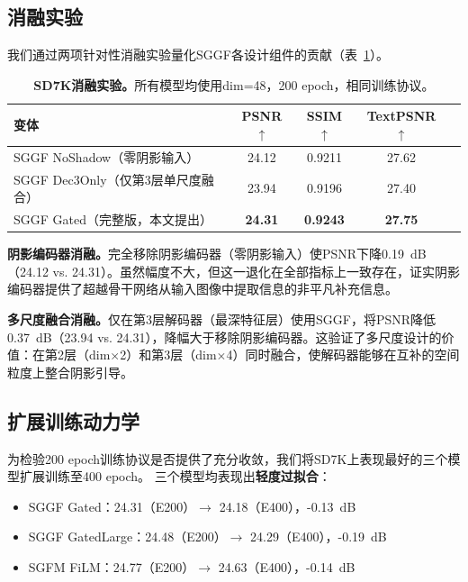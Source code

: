\documentclass[11pt]{ctexart}
\begin{document}
\subsection{消融实验}
\label{sec:ablation}

我们通过两项针对性消融实验量化SGGF各设计组件的贡献（表~\ref{tab:ablation}）。

\begin{table}[t]
\centering
\caption{\textbf{SD7K消融实验。}所有模型均使用dim=48，200 epoch，相同训练协议。}
\label{tab:ablation}
\begin{tabular}{@{}lcccc@{}}
\toprule
\textbf{变体} & \textbf{PSNR$\uparrow$} & \textbf{SSIM$\uparrow$} & \textbf{TextPSNR$\uparrow$} \\
\midrule
SGGF NoShadow（零阴影输入） & 24.12 & 0.9211 & 27.62 \\
SGGF Dec3Only（仅第3层单尺度融合） & 23.94 & 0.9196 & 27.40 \\
\rowcolor{gray!15}
SGGF Gated（完整版，本文提出） & \textbf{24.31} & \textbf{0.9243} & \textbf{27.75} \\
\bottomrule
\end{tabular}
\end{table}

\textbf{阴影编码器消融。}完全移除阴影编码器（零阴影输入）使PSNR下降0.19~dB（24.12 vs. 24.31）。虽然幅度不大，但这一退化在全部指标上一致存在，证实阴影编码器提供了超越骨干网络从输入图像中提取信息的非平凡补充信息。

\textbf{多尺度融合消融。}仅在第3层解码器（最深特征层）使用SGGF，将PSNR降低0.37~dB（23.94 vs. 24.31），降幅大于移除阴影编码器。这验证了多尺度设计的价值：在第2层（dim$\times$2）和第3层（dim$\times$4）同时融合，使解码器能够在互补的空间粒度上整合阴影引导。

\subsection{扩展训练动力学}
\label{sec:extended}

为检验200 epoch训练协议是否提供了充分收敛，我们将SD7K上表现最好的三个模型扩展训练至400 epoch。
三个模型均表现出\textbf{轻度过拟合}：

\begin{itemize}
  \item SGGF Gated：24.31（E200）$\rightarrow$ 24.18（E400），-0.13~dB
  \item SGGF GatedLarge：24.48（E200）$\rightarrow$ 24.29（E400），-0.19~dB
  \item SGFM FiLM：24.77（E200）$\rightarrow$ 24.63（E400），-0.14~dB
\end{itemize}
\end{document}
